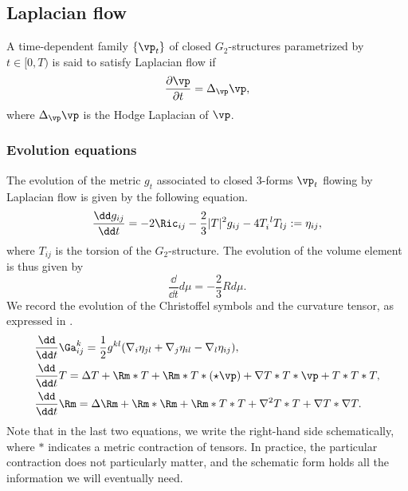 \documentclass[hidelinks, 12pt, oneside, reqno]{amsart}
\begin{document}
\subsection{Laplacian flow}

A time-dependent family $\{\vp_t\}$ of closed $G_2$-structures parametrized by $t\in [0,T)$ is said to satisfy Laplacian flow if 
\begin{equation}\label{equation laplacian flow}
     \frac{\partial \vp}{\partial t} = \Delta_{\vp} \vp,
\end{equation}
where $\Delta_{\vp} \vp$ is the Hodge Laplacian of $\vp$.

\subsubsection{Evolution equations}

The evolution of the metric $g_t$ associated to closed 3-forms $\vp_t$ flowing by Laplacian flow is given by the following equation.
\begin{equation}\label{equation evolution metrics}
         \frac{\dd g_{ij}}{\dd t} = -2 \Ric_{ij} - \frac{2}{3}|T|^2 g_{ij}- 4 T_i^{\;  l}T_{lj} := \eta_{ij},
\end{equation}
where $T_{ij}$ is the torsion of the $G_2$-structure. The evolution of the volume element is thus given by
\begin{equation}\label{equation evolution volume}
         \frac{\dd }{\dd t}d\mu =  - \frac{2}{3}R d\mu. 
\end{equation}
We record the evolution of the Christoffel symbols and the curvature tensor, as expressed in \cite{LotayWeiLaplacianFlow}.
\begin{align}
    &\frac{\dd }{\dd t}\Ga^k_{ij} = \frac12 g^{kl}(\nabla_i \eta_{jl} + \nabla_j \eta_{il} - \nabla_l \eta_{ij}),
    \label{equation evolution christoffel symbols} \\
    &\frac{\dd }{\dd t} T = \Delta T + \Rm * T + \Rm * T * (\star \vp) + \nabla T * T * \vp + T * T*T,
   \label{equation evolution torsion}\\
   &\frac{\dd }{\dd t} \Rm = \Delta \Rm + \Rm * \Rm + \Rm * T * T + \nabla^2 T * T + \nabla T * \nabla T.
   \label{equation evolution curvature}
\end{align}
Note that in the last two equations, we write the right-hand side schematically, where $*$ indicates a metric contraction of tensors. In practice, the particular contraction does not particularly matter, and the schematic form holds all the information we will eventually need.
\end{document}
